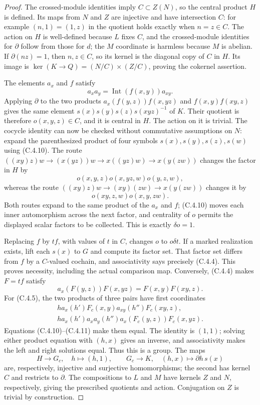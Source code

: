 \begin{proof}
The crossed-module identities imply $C\subset Z(N)$, so the central
product $H$ is defined.  Its maps from $N$ and $Z$ are injective and
have intersection $C$: for example $(n,1)=(1,z)$ in the quotient
holds exactly when $n=z\in C$.  The action on $H$ is well-defined
because $L$ fixes $C$, and the crossed-module identities for $\partial$
follow from those for $d$; the $M$ coordinate is harmless because $M$
is abelian.  If $\partial(nz)=1$, then $n,z\in C$, so its kernel is
the diagonal copy of $C$ in $H$.  Its image is
$\ker(K\to Q)=(N/C)\times(Z/C)$, proving the cokernel assertion.

The elements $a_x$ and $f$ satisfy
\[
                  a_xa_y=\operatorname{Int}(f(x,y))a_{xy}.
                                                        \tag{C.4.10}
\]
Applying $\partial$ to the two products
$a_x(f(y,z))f(x,yz)$ and $f(x,y)f(xy,z)$ gives the same element
$s(x)s(y)s(z)s(xyz)^{-1}$ of $K$.  Their quotient is therefore
$o(x,y,z)\in C$, and it is central in $H$.  The action on it is trivial.
The cocycle identity can now be checked without commutative assumptions
on $N$: expand the parenthesized product of four symbols
$s(x),s(y),s(z),s(w)$ using (C.4.10).  The route
$((xy)z)w\to(x(yz))w\to x((yz)w)\to x(y(zw))$
changes the factor in $H$ by
\[
                    o(x,y,z)o(x,yz,w)o(y,z,w),
\]
whereas the route
$((xy)z)w\to(xy)(zw)\to x(y(zw))$
changes it by
\[
                    o(xy,z,w)o(x,y,zw).
\]
Both routes expand to the same product of the $a_x$ and $f$; (C.4.10)
moves each inner automorphism across the next factor, and centrality
of $o$ permits the displayed scalar factors to be collected.  This is
exactly $\delta o=1$.

Replacing $f$ by $tf$, with values of $t$ in $C$, changes $o$ to
$o\delta t$.  If a marked realization exists, lift each $s(x)$ to
$G$ and compute its factor set.  That factor set differs from $f$
by a $C$-valued cochain, and associativity says precisely (C.4.4).
This proves necessity, including the actual comparison map.
Conversely, (C.4.4) makes $F=tf$ satisfy
\[
 a_x(F(y,z))F(x,yz)=F(x,y)F(xy,z).
                                                        \tag{C.4.11}
\]
For (C.4.5), the two products of three pairs have first coordinates
\[
 \begin{split}
 h a_x(h')F_c(x,y)a_{xy}(h'')F_c(xy,z),\\
 h a_x(h')a_xa_y(h'')a_x(F_c(y,z))F_c(x,yz).
 \end{split}
\]
Equations (C.4.10)--(C.4.11) make them equal.  The identity is $(1,1)$;
solving either product equation with $(h,x)$ gives an inverse, and
associativity makes the left and right solutions equal.  Thus this is
a group.  The maps
\[
 H\longrightarrow G_c,\quad h\longmapsto(h,1),\qquad
 G_c\longrightarrow K,\quad (h,x)\longmapsto\partial h\,s(x)
\]
are, respectively, injective and surjective homomorphisms; the second
has kernel $C$ and restricts to $\partial$.  The compositions to $L$
and $M$ have kernels $Z$ and $N$, respectively, giving the prescribed
quotients and action.  Conjugation on $Z$ is trivial by construction.


\end{proof}
